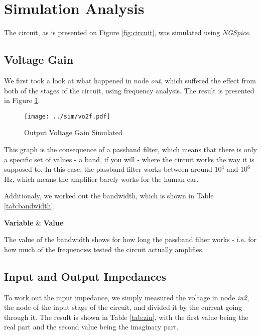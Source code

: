 \clearpage

\section{Simulation Analysis}
\label{sec:simulation}

The circuit, as is presented on Figure \ref{fig:circuit}, was simulated using \textit{NGSpice}.

\subsection{Voltage Gain}

We first took a look at what happened in node \textit{out}, which suffered the effect from both of the stages of the circuit, using frequency analysis. The result is presented in Figure \ref{fig:vo2f}.

\begin{figure}[h] \centering
\texttt{[image: ../sim/vo2f.pdf]}
\caption{Output Voltage Gain Simulated}
\label{fig:vo2f}
\end{figure}

This graph is the consequence of a passband filter, which means that there is only a specific set of values - a band, if you will - where the circuit works the way it is supposed to. In this case, the passband filter works between around $10^4$ and $10^6$ Hz, which means the amplifier barely works for the human ear.

Additionaly, we worked out the bandwidth, which is shown in Table \ref{tab:bandwidth}.

\begin{tabular} \label{tab:bandwidth}
  \hline    
  {\bf Variable} & {\bf Value} \\ \hline
  
\end{tabular}

The value of the bandwidth shows for how long the passband filter works - i.e. for how much of the frequencies tested the circuit actually amplifies.

\subsection{Input and Output Impedances}

To work out the input impedance, we simply measured the voltage in node \textit{in2}, the node of the input stage of the circuit, and divided it by the current going through it. The result is shown in Table \ref{tab:zin}, with the first value being the real part and the second value being the imaginary part.

